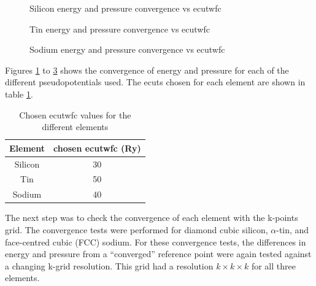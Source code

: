 \documentclass[12pt]{article}
\begin{document}
\begin{figure}
	\centering
	\subfloat{
		
}\qquad
\subfloat{
		
}\qquad
\caption{Silicon energy and pressure convergence vs ecutwfc}
\label{fig:silicon_ecut_convergence}
\end{figure}
\begin{figure}
	\centering
	\subfloat{
		
}\qquad
\subfloat{
		
}\qquad
\caption{Tin energy and pressure convergence vs ecutwfc}
\label{fig:tin_ecut_convergence}
\end{figure}
\begin{figure}
	\centering
	\subfloat{
		
}\qquad
\subfloat{
		
}\qquad
\caption{Sodium energy and pressure convergence vs ecutwfc}
\label{fig:sodium_ecut_convergence}
\end{figure}

Figures \ref{fig:silicon_ecut_convergence} to \ref{fig:sodium_ecut_convergence} shows the convergence of energy and pressure for each of the different pseudopotentials used.
The ecuts chosen for each element are shown in table \ref{tab:chosenecuts}.

\begin{table}
\centering
	\begin{tabular}{|c|c|}
\hline
Element & chosen ecutwfc (Ry)\\
\hline
Silicon &  30\\
Tin &  50\\
Sodium &  40\\
\hline
\end{tabular}
\caption{Chosen ecutwfc values for the different elements}
\label{tab:chosenecuts}
\end{table}

The next step was to check the convergence of each element with the k-points grid. The convergence tests were performed for diamond cubic silicon, $\alpha$-tin, and face-centred cubic (FCC) sodium. For these convergence tests, the differences in energy and pressure from a ``converged'' reference point were again tested against a changing k-grid resolution. This grid had a resolution $k\times k \times k$ for all three elements.
\end{document}
